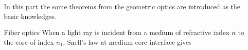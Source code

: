 In this part the  some theorems from the geometric optics  are introduced as the basic knowledges.

Fiber optics
When a light ray is incident from a medium of refractive index $n$ to the core of index $n_{1}$, Snell's law at medium-core interface gives